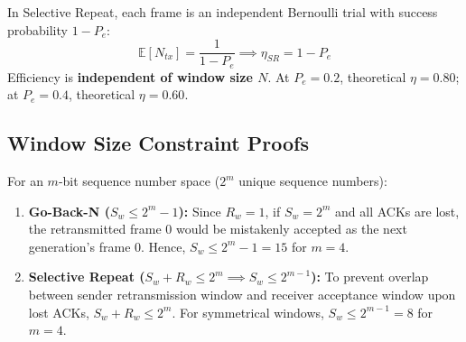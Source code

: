 \documentclass[11pt,a4paper]{article}
\begin{document}
\begin{proofbox}
In Selective Repeat, each frame is an independent Bernoulli trial with success probability $1 - P_e$:
\begin{equation}
    \mathbb{E}[N_{tx}] = \frac{1}{1 - P_e} \implies \eta_{SR} = 1 - P_e
\end{equation}
Efficiency is \textbf{independent of window size $N$}. At $P_e=0.2$, theoretical $\eta=0.80$; at $P_e=0.4$, theoretical $\eta=0.60$.
\end{proofbox}

\subsection{Window Size Constraint Proofs}

\begin{proofbox}
For an $m$-bit sequence number space ($2^m$ unique sequence numbers):
\begin{enumerate}[label=\textbf{(\alph*)}, leftmargin=1.2em]
    \item \textbf{Go-Back-N ($S_w \le 2^m - 1$):} Since $R_w = 1$, if $S_w = 2^m$ and all ACKs are lost, the retransmitted frame 0 would be mistakenly accepted as the next generation's frame 0. Hence, $S_w \le 2^m - 1 = 15$ for $m=4$.
    \item \textbf{Selective Repeat ($S_w + R_w \le 2^m \implies S_w \le 2^{m-1}$):} To prevent overlap between sender retransmission window and receiver acceptance window upon lost ACKs, $S_w + R_w \le 2^m$. For symmetrical windows, $S_w \le 2^{m-1} = 8$ for $m=4$.
\end{enumerate}
\end{proofbox}
\end{document}
